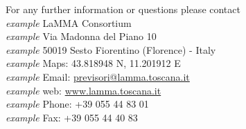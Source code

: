 \documentclass[11pt,english]{article}
\begin{document}
\vspace{5.55cm}
\begin{flushright}
\large{For any further information or questions please contact
\\\textit{example} LaMMA Consortium
\\\textit{example} Via Madonna del Piano 10
\\\textit{example} 50019 Sesto Fiorentino (Florence) - Italy
\\\textit{example} Maps: 43.818948 N, 11.201912 E
\\\textit{example} Email: \href{mailto:previsori@lamma.toscana.it}{previsori@lamma.toscana.it}
\\\textit{example} web: \href{www.lamma.toscana.it}{www.lamma.toscana.it}
\\\textit{example} Phone: +39 055 44 83 01
\\\textit{example} Fax: +39 055 44 40 83}
\end{flushright}

\end{document}
